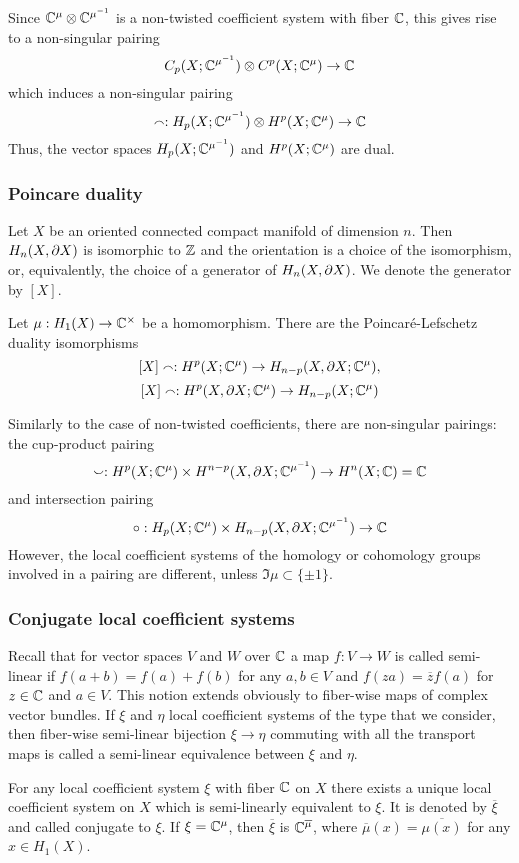 \documentclass{article}
\numberwithin{equation}{section}
\begin{document}
Since $\mathbb C^\mu\otimes\mathbb C^{\mu^{-1}}$ is a non-twisted coefficient system
with fiber $\mathbb C$, this gives rise to a non-singular pairing
$$
 C_p(X;\mathbb C^{\mu^{-1}})\otimes C^p(X;\mathbb C^\mu)\to \mathbb C 
$$
which induces a non-singular pairing 
$$
\smallfrown: H_p(X;\mathbb C^{\mu^{-1}})\otimes H^p(X;\mathbb C^\mu)\to \mathbb C
$$
Thus, the vector spaces $H_p(X;\mathbb C^{\mu^{-1}})$ and
$H^p(X;\mathbb C^\mu)$ are dual.

\subsubsection{Poincare duality}\label{sT.4.3} 
Let $X$ be an oriented connected compact manifold of dimension $n$.
Then $H_n(X,\partial X)$ is isomorphic to $\mathbb Z$ and the orientation is a 
choice of the isomorphism, or, equivalently, the choice of a generator
of $H_n(X,\partial X)$. We denote the generator by $[X]$.

Let $\mu:H_1(X)\to\mathbb C^\times$ be a homomorphism. There are the
Poincar\'{e}-Lefschetz duality isomorphisms
$$[X]\smallfrown :H^p(X;\mathbb C^\mu)\to H_{n-p}(X,\partial X;\mathbb C^{\mu}),
$$
$$ [X]\smallfrown :H^p(X,\partial X;\mathbb C^\mu)\to H_{n-p}(X;\mathbb C^{\mu}) 
$$

Similarly to the case of non-twisted coefficients, there are 
non-singular pairings:
the cup-product pairing 
$$
\smallsmile:H^p(X;\mathbb C^\mu)\times H^{n-p}(X,\partial X;\mathbb C^{\mu^{-1}})\to
H^n(X;\mathbb C)=\mathbb C
$$
and intersection pairing
\begin{equation}\label{bilinIp}
\circ:H_p(X;\mathbb C^\mu)\times H_{n-p}(X,\partial X;\mathbb C^{\mu^{-1}})\to \mathbb C
\end{equation}
However, the local coefficient systems of the homology or cohomology
groups involved in a pairing are different,
unless $\Im\mu\subset\{\pm1\}$. 

\subsubsection{Conjugate local coefficient systems}\label{sT.4.4} 
Recall that for vector spaces $V$ and
$W$ over $\mathbb C$ a map $f:V\to W$ is called semi-linear if $f(a+b)=f(a)+f(b)$
for any $a,b\in V$ and $f(za)=\overline zf(a)$ for $z\in\mathbb C$ and $a\in
V$. This notion extends obviously to fiber-wise maps of complex vector
bundles. If $\xi$ and $\eta$ local coefficient systems of the type that
we consider, then fiber-wise semi-linear bijection $\xi\to\eta$ commuting 
with all the transport maps is called a {\sfit semi-linear
equivalence\/} between $\xi$ and $\eta$.

For any local coefficient system $\xi$ with fiber $\mathbb C$ on $X$ there
exists a unique local coefficient system on $X$ which is
semi-linearly equivalent to  $\xi$. It is denoted by $\overline\xi$ and
called {\sfit conjugate\/} to $\xi$.
If $\xi=\mathbb C^\mu$, then $\overline\xi$ is $\mathbb C^{\overline\mu}$, where
$\overline\mu(x)=\overline{\mu(x)}$ for any $x\in H_1(X)$.
\end{document}
